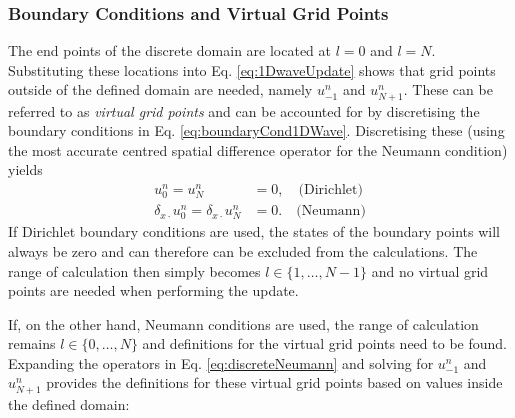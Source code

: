 \subsubsection{Boundary Conditions and Virtual Grid Points}
The end points of the discrete domain are located at $l = 0$ and $l = N$.
Substituting these locations into Eq. \eqref{eq:1DwaveUpdate} shows that grid points outside of the defined domain are needed, namely $u_{-1}^n$ and $u_{N+1}^n$. These can be referred to as \textit{virtual grid points} and can be accounted for %
by discretising the boundary conditions in Eq. \eqref{eq:boundaryCond1DWave}. Discretising these (using the most accurate centred spatial difference operator for the Neumann condition) yields
\begin{subequations}
    \begin{align}
        u_0^n = u_N^n &= 0, \quad\text{(Dirichlet)}\label{eq:discreteDirichlet}\\
        \delta_{x\cdot} u_0^n = \delta_{x\cdot} u_N^n &= 0. \quad \text{(Neumann)}\label{eq:discreteNeumann}
    \end{align}
\end{subequations}
If Dirichlet boundary conditions are used, the states of the boundary points will always be zero and can therefore can be excluded from the calculations. The range of calculation then simply becomes $l\in\{1,\hdots, N-1\}$ and no virtual grid points are needed when performing the update.

If, on the other hand, Neumann conditions are used, the range of calculation remains $l\in\{0,\hdots, N\}$ and definitions for the virtual grid points need to be found.
Expanding the operators in Eq. \eqref{eq:discreteNeumann} and solving for $u_{-1}^n$ and $u_{N+1}^n$ provides the definitions for these virtual grid points based on values inside the defined domain:

